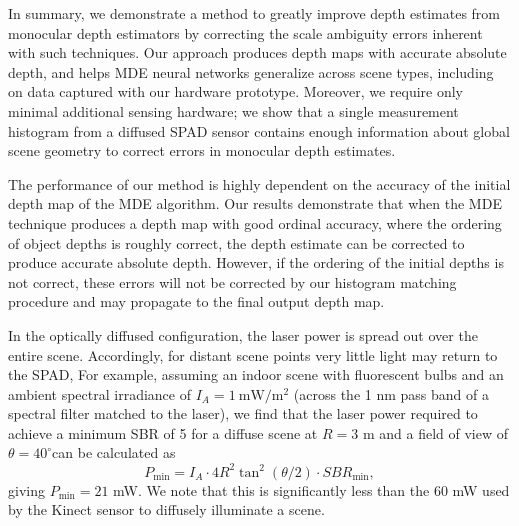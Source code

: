 In summary, we demonstrate a method to greatly improve depth estimates from
monocular depth estimators by correcting the scale ambiguity errors inherent
with such techniques. Our approach produces depth maps with accurate absolute
depth, and helps MDE neural networks generalize across scene
types, including on data captured with our hardware prototype.  Moreover, we
require only minimal additional sensing hardware; we show that a single
measurement histogram from a diffused SPAD sensor contains enough information
about global scene geometry to correct errors in monocular depth estimates.

The performance of our method is highly dependent on the accuracy of the initial
depth map of the MDE algorithm. Our results demonstrate that when the MDE
technique produces a depth map with good ordinal accuracy, where the ordering of
object depths is roughly correct, the depth estimate can be corrected to produce
accurate absolute depth. However, if the ordering of the initial depths is not
correct, these errors will not be corrected by our histogram matching procedure
and may propagate to the final output depth map.

In the optically diffused configuration, the laser
power is spread out over the entire scene. Accordingly, for distant scene points
very little light may return to the SPAD,  
 For example, assuming an indoor scene with
fluorescent bulbs and an ambient spectral irradiance of $I_A =
1~\text{mW}/\text{m}^2$ (across the 1 nm pass band of a spectral filter matched
to the laser), we find that the laser power required to achieve a minimum SBR of
5 for a diffuse scene at $R = 3$ m and a field of view of
$\theta = 40^\circ$\textdegree can be calculated as
%
\begin{equation}
  P_{\text{min}} = I_A \cdot 4 R^2 \tan^2(\theta/2) \cdot SBR_{\text{min}},
\end{equation}
giving $P_{\text{min}}=21$ mW. We note that this is significantly
less than the 60 mW used by the Kinect sensor to diffusely illuminate a scene.

